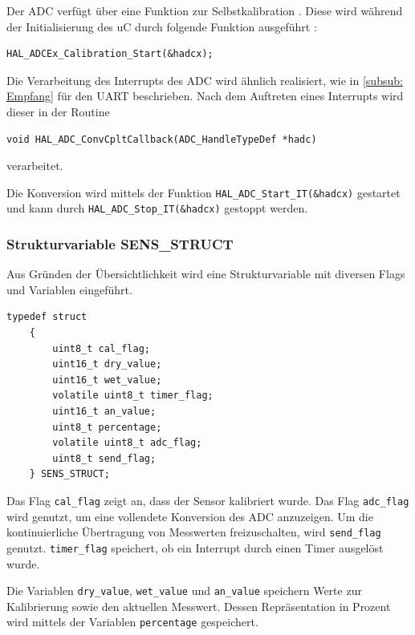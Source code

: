   Der \ac{ADC} verfügt über eine Funktion zur Selbstkalibration \citep{STM32_Ref}. Diese wird während der Initialisierung des \ac{uC} durch folgende Funktion ausgeführt \citep{HAL_Description}:
  \begin{lstlisting}[caption={\textit{ADC Kalibrierung}}]
    HAL_ADCEx_Calibration_Start(&hadcx);      
  \end{lstlisting}

  \newpage

  Die Verarbeitung des  Interrupts des \ac{ADC} wird ähnlich realisiert, wie in \ref{subsub: Empfang} für den \ac{UART} beschrieben. Nach dem Auftreten eines 
  Interrupts wird dieser in der Routine
  \begin{lstlisting}[caption={\textit{ADC Callback}}]
    void HAL_ADC_ConvCpltCallback(ADC_HandleTypeDef *hadc)
  \end{lstlisting}  
  verarbeitet. 

  \smallskip

  Die Konversion wird mittels der Funktion \lstinline!HAL_ADC_Start_IT(&hadcx)! gestartet und kann durch \lstinline!HAL_ADC_Stop_IT(&hadcx)! gestoppt werden.

  \subsubsection{Strukturvariable SENS\_STRUCT}
  \label{subsub: SENSSTRUCT}
  Aus Gründen der Übersichtlichkeit wird eine Strukturvariable mit diversen Flags und Variablen eingeführt.
  \begin{lstlisting}[caption={\textit{Sensor Strukturvariable}}]
    typedef struct
    {
        uint8_t cal_flag;						
        uint16_t dry_value;			
        uint16_t wet_value;			
        volatile uint8_t timer_flag;	
        uint16_t an_value;			
        uint8_t percentage;			
        volatile uint8_t adc_flag;	
        uint8_t send_flag;			 
    } SENS_STRUCT;
  \end{lstlisting}

  Das Flag \lstinline!cal_flag! zeigt an, dass der Sensor kalibriert wurde. Das Flag \lstinline!adc_flag! wird genutzt, um eine vollendete Konversion des \ac{ADC} anzuzeigen.
  Um die kontinuierliche Übertragung von Messwerten freizuschalten, wird \lstinline!send_flag! genutzt. \lstinline!timer_flag! speichert, ob ein Interrupt durch einen
  Timer ausgelöst wurde.

  \smallskip
  Die Variablen \lstinline!dry_value!, \lstinline!wet_value! und \lstinline!an_value! speichern Werte zur Kalibrierung sowie den aktuellen Messwert. Dessen Repräsentation
  in Prozent wird mittels der Variablen \lstinline!percentage! gespeichert.

